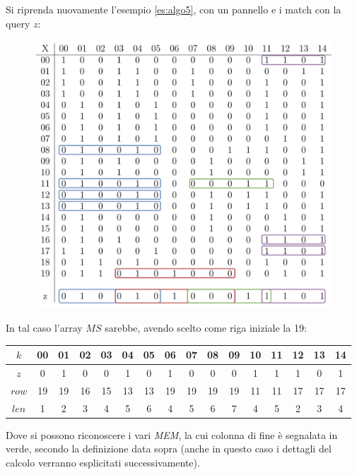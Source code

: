 \begin{esempio}
  Si riprenda nuovamente l'esempio \ref{es:algo5}, con un pannello e i match con
  la query $z$:
  \begin{figure}[H]
    \centering
    \includegraphics[scale = 0.365]{img/pbwtmatch.pdf}
  \end{figure}
  In tal caso l'array $MS$ sarebbe, avendo scelto come riga iniziale la 19:
  \begin{table}[H]
    \footnotesize{}
    \centering
    \begin{tabular}{c|ccccccccccccccc}
      $k$ & 00 & 01 & 02 & 03 & 04 &  {\color{nordgreen}05} & 06 & 07 & 08
      &  {\color{nordgreen}09} & 10 &  {\color{nordgreen}11} & 12 & 13
      &  {\color{nordgreen}14} \\
      \hline
      \hline
      $z$ & 0 & 1 & 0 & 0 & 1 &  {\color{nordgreen}0} & 1 & 0 & 0
      &  {\color{nordgreen}0} & 1 &  {\color{nordgreen}1} & 1 & 0
      &  {\color{nordgreen}1} \\
      \hline
      $row$ & 19 & 19 & 16 & 15 & 13 &  {\color{nordgreen}13} & 19 & 19 & 19
      &  {\color{nordgreen}19} & 11 &  {\color{nordgreen}11} & 17 & 17
      &  {\color{nordgreen}17} \\
      $len$ & 1 & 2 & 3 & 4 & 5 & {\color{nordgreen}6} & 4 & 5 & 6
      & {\color{nordgreen}7} & 4 & {\color{nordgreen}5} & 2 & 3
      & {\color{nordgreen}4}\\
    \end{tabular}
  \end{table}
  Dove si possono riconoscere i vari \textit{MEM}, la cui colonna di fine è
  segnalata in verde, secondo la definizione data
  sopra (anche in questo caso i dettagli del calcolo
  verranno esplicitati successivamente). 
\end{esempio}

